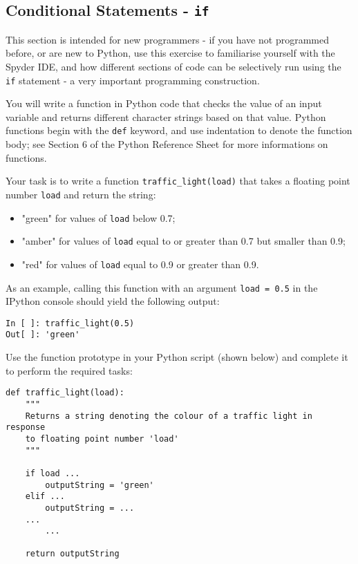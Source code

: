 \subsection{Conditional Statements - {\tt if}}

This section is intended for new programmers - if you have not programmed before, or are new to Python, use this exercise to familiarise yourself with the Spyder IDE, and how different sections of code can be selectively run using the {\tt if} statement - a very important programming construction.

You will write a function in Python code that checks the value of an input variable and returns different character strings based on that value. Python functions begin with the {\tt def} keyword, and use indentation to denote the function body; see Section 6 of the Python Reference Sheet for more informations on functions. 

Your task is to write a function {\tt traffic\_light(load)} that takes a floating point number {\tt load} and return the string:

\begin{itemize}
	\item "green" for values of {\tt load} below 0.7;
	\item "amber" for values of {\tt load} equal to or greater than 0.7 but smaller than 0.9;
	\item "red" for values of {\tt load} equal to 0.9 or greater than 0.9.
\end{itemize}

As an example, calling this function with an argument {\tt load = 0.5} in the IPython console should yield the following output:

\begin{lstlisting}[frame=single]
In [ ]: traffic_light(0.5)
Out[ ]: 'green'
\end{lstlisting}

Use the function prototype in your Python script (shown below) and complete it to perform the required tasks:

\begin{lstlisting}[frame=single]
def traffic_light(load):
    """
    Returns a string denoting the colour of a traffic light in response
    to floating point number 'load'
    """

    if load ...
        outputString = 'green'
    elif ...
        outputString = ...
    ...
        ...
        
    return outputString
\end{lstlisting}

